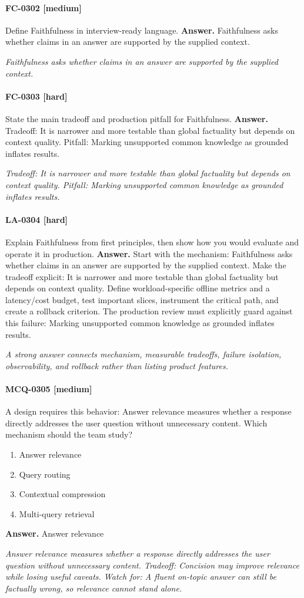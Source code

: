 \paragraph{FC-0302 [medium]} Define Faithfulness in interview-ready language.
\noindent\textbf{Answer.} Faithfulness asks whether claims in an answer are supported by the supplied context.
\par\textit{Faithfulness asks whether claims in an answer are supported by the supplied context.}
\paragraph{FC-0303 [hard]} State the main tradeoff and production pitfall for Faithfulness.
\noindent\textbf{Answer.} Tradeoff: It is narrower and more testable than global factuality but depends on context quality. Pitfall: Marking unsupported common knowledge as grounded inflates results.
\par\textit{Tradeoff: It is narrower and more testable than global factuality but depends on context quality. Pitfall: Marking unsupported common knowledge as grounded inflates results.}
\paragraph{LA-0304 [hard]} Explain Faithfulness from first principles, then show how you would evaluate and operate it in production.
\noindent\textbf{Answer.} Start with the mechanism: Faithfulness asks whether claims in an answer are supported by the supplied context. Make the tradeoff explicit: It is narrower and more testable than global factuality but depends on context quality. Define workload-specific offline metrics and a latency/cost budget, test important slices, instrument the critical path, and create a rollback criterion. The production review must explicitly guard against this failure: Marking unsupported common knowledge as grounded inflates results.
\par\textit{A strong answer connects mechanism, measurable tradeoffs, failure isolation, observability, and rollback rather than listing product features.}
\paragraph{MCQ-0305 [medium]} A design requires this behavior: Answer relevance measures whether a response directly addresses the user question without unnecessary content. Which mechanism should the team study?
\begin{enumerate}[label=\Alph*.]
\item Answer relevance
\item Query routing
\item Contextual compression
\item Multi-query retrieval
\end{enumerate}
\noindent\textbf{Answer.} Answer relevance
\par\textit{Answer relevance measures whether a response directly addresses the user question without unnecessary content. Tradeoff: Concision may improve relevance while losing useful caveats. Watch for: A fluent on-topic answer can still be factually wrong, so relevance cannot stand alone.}
